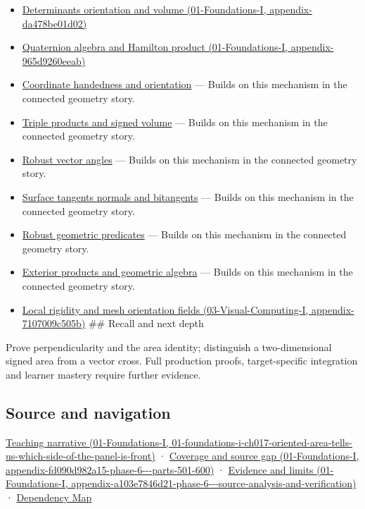 \begin{itemize}
\item
  \href{../01-Foundations-I/main.pdf\#nameddest=appendix-da478be01d02}{Determinants orientation and volume (01-Foundations-I, appendix-da478be01d02)}
\item
  \href{../01-Foundations-I/main.pdf\#nameddest=appendix-965d9260eeab}{Quaternion algebra and Hamilton product (01-Foundations-I, appendix-965d9260eeab)}
\item
  \hyperref[appendix-87d7626c8d37]{Coordinate handedness and orientation} --- Builds on this mechanism in the connected geometry story.
\item
  \hyperref[appendix-5caa058bd9c7]{Triple products and signed volume} --- Builds on this mechanism in the connected geometry story.
\item
  \hyperref[appendix-e569e60e18e6]{Robust vector angles} --- Builds on this mechanism in the connected geometry story.
\item
  \hyperref[appendix-e31893dec985]{Surface tangents normals and bitangents} --- Builds on this mechanism in the connected geometry story.
\item
  \hyperref[appendix-341296fb3f64]{Robust geometric predicates} --- Builds on this mechanism in the connected geometry story.
\item
  \hyperref[appendix-e1960925d1b8]{Exterior products and geometric algebra} --- Builds on this mechanism in the connected geometry story.
\item
  \href{../03-Visual-Computing-I/main.pdf\#nameddest=appendix-7107009c505b}{Local rigidity and mesh orientation fields (03-Visual-Computing-I, appendix-7107009c505b)} \#\# Recall and next depth
\end{itemize}

Prove perpendicularity and the area identity; distinguish a two-dimensional signed area from a vector cross. Full production proofs, target-specific integration and learner mastery require further evidence.

\subsection{Source and navigation}\label{appendix-2391db8052b1-source-and-navigation}

\href{../01-Foundations-I/main.pdf\#nameddest=01-foundations-i-ch017-oriented-area-tells-us-which-side-of-the-panel-is-front}{Teaching narrative (01-Foundations-I, 01-foundations-i-ch017-oriented-area-tells-us-which-side-of-the-panel-is-front)} · \href{../01-Foundations-I/main.pdf\#nameddest=appendix-fd090d982a15-phase-6---parts-501-600}{Coverage and source gap (01-Foundations-I, appendix-fd090d982a15-phase-6-\/-\/-parts-501-600)} · \href{../01-Foundations-I/main.pdf\#nameddest=appendix-a103e7846d21-phase-6---source-analysis-and-verification}{Evidence and limits (01-Foundations-I, appendix-a103e7846d21-phase-6-\/-\/-source-analysis-and-verification)} · \hyperref[appendix-4ad47bdd269a]{Dependency Map}
